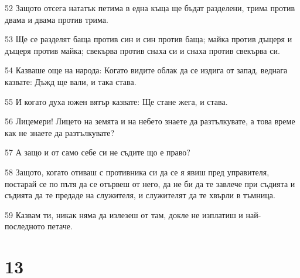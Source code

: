 \par 52 Защото отсега нататък петима в една къща ще бъдат разделени, трима против двама и двама против трима.
\par 53 Ще се разделят баща против син и син против баща; майка против дъщеря и дъщеря против майка; свекърва против снаха си и снаха против свекърва си.
\par 54 Казваше още на народа: Когато видите облак да се издига от запад, веднага казвате: Дъжд ще вали, и така става.
\par 55 И когато духа южен вятър казвате: Ще стане жега, и става.
\par 56 Лицемери! Лицето на земята и на небето знаете да разтълкувате, а това време как не знаете да разтълкувате?
\par 57 А защо и от само себе си не съдите що е право?
\par 58 Защото, когато отиваш с противника си да се я явиш пред управителя, постарай се по пътя да се отървеш от него, да не би да те завлече при съдията и съдията да те предаде на служителя, и служителят да те хвърли в тъмница.
\par 59 Казвам ти, никак няма да излезеш от там, докле не изплатиш и най-последното петаче.

\chapter{13}

